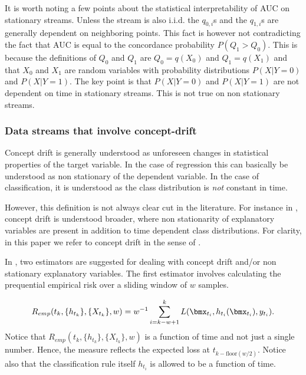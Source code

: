 It is worth noting a few points about the statistical interpretability of AUC on stationary streams.  Unless the stream is also i.i.d. the $q_{0,i}$s and the $q_{1,i}$s are generally dependent on neighboring points.  This fact is however not contradicting the fact that AUC is equal to the concordance probability $ P(Q_1 > Q_0)$.  This is because the definitions of $Q_0$ and $Q_1$ are $Q_0 = q(X_0)$ and $Q_1 = q(X_1)$ and 
that $X_0$ and $X_1$ are random variables with probability distributions $P(X | Y = 0)$ and $P(X | Y = 1)$.  The key point is that $P(X | Y = 0)$ and $P(X | Y = 1)$ are not dependent on time in stationary streams.  This is not true on non stationary streams.  


\subsubsection{Data streams that involve concept-drift}

Concept drift is generally understood as unforeseen changes in statistical properties of the target variable.  In the case of regression this can basically be understood as non stationary of the dependent variable.  In the case of classification, it is understood as the class distribution is \emph{not} constant in time.  

However, this definition is not always clear cut in the literature.  For instance in \cite{Brz14}, concept drift is understood broader, where non stationarity of explanatory variables are present in addition to time dependent class distributions.   For clarity, in this paper we refer to concept drift in the sense of \cite{Brz14}.

In \cite{Gam13}, two estimators are suggested for dealing with concept drift and/or non stationary explanatory variables.  The first estimator involves calculating the prequential empirical risk over a sliding window of $w$ samples. 

\begin{equation}
\label{eq:prequentialRisk2}
R_{emp}(t_k, \{h_{t_k}\}, \{X_{t_k}\}, w) = w^{-1} \sum_{i=k - w +1}^k L(\bmx_{t_i} , h_{t_i}(\bmx_{t_i} ), y_{t_i}).
\end{equation}
Notice that $R_{emp}(t_k, \{h_{t_k}\}, \{X_{t_k}\}, w)$ is a function of time and not just a single number.  Hence, the measure reflects the expected loss at $t_{k-\mbox{floor}(w/2)}$.  Notice also that the classification rule itself $h_{t_i}$ is allowed to be a function of time.

